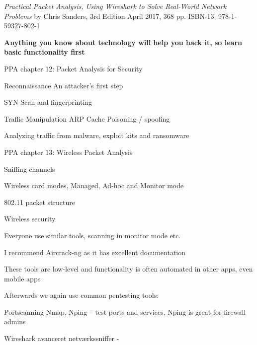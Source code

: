 \documentclass[Screen16to9,17pt]{foils}
\begin{document}


\emph{Practical Packet Analysis,
Using Wireshark to Solve Real-World Network Problems}
by Chris Sanders, 3rd Edition
April 2017, 368 pp.
ISBN-13:
978-1-59327-802-1

{\bf Anything you know about technology will help you hack it, so learn basic functionality first}



\begin{alltt}\footnotesize

\end{alltt}

\begin{list1}
\item PPA chapter 12: Packet Analysis for Security
\begin{list2}
\item Reconnaissance An attacker’s first step
\item SYN Scan and fingerprinting
\item Traffic Manipulation ARP Cache Poisoning / spoofing
\item  Analyzing traffic from malware, exploit kits and ransomware
\end{list2}
\end{list1}

\begin{list1}
\item PPA chapter 13: Wireless Packet Analysis
\begin{list2}
\item Sniffing channels
\item Wireless card modes, Managed, Ad-hoc and Monitor mode
\item 802.11 packet structure
\item Wireless security
\end{list2}
\end{list1}






\begin{list2}
\item Everyone use similar tools, scanning in monitor mode etc.

\item I recommend Aircrack-ng as it has excellent documentation 
\item These tools are low-level and functionality is often automated in other apps, even mobile apps
\item Afterwards we again use common pentesting tools:
\item Portscanning Nmap, Nping -- test ports and services, Nping is great for firewall admins 
\item Wireshark avanceret netværkssniffer - 
\end{list2}
\end{document}
